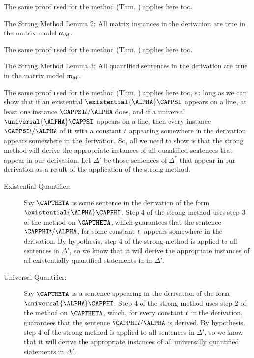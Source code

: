 \begin{PROOF}
The same proof used for the method (Thm. ) applies here too.
\end{PROOF}
\begin{THEOREM}{ The Strong Method Lemma 2:}
All matrix instances in the derivation are true in the matrix model $\mathfrak{m}_M$.
\end{THEOREM}
\begin{PROOF}
The same proof used for the method (Thm. ) applies here too.
\end{PROOF}
\begin{THEOREM}{ The Strong Method Lemma 3:}
All quantified sentences in the derivation are true in the matrix model $\mathfrak{m}_M$.
\end{THEOREM}
\begin{PROOF}
The same proof used for the method (Thm. ) applies here too, so long as we can show that if an existential $\existential{\ALPHA}\CAPPSI$ appears on a line, at least one instance $\CAPPSI\variable{t}/\ALPHA$ does, and if a universal $\universal{\ALPHA}\CAPPSI$ appears on a line, then every instance $\CAPPSI\variable{t}/\ALPHA$ of it with a constant $t$ appearing somewhere in the derivation appears somewhere in the derivation. So, all we need to show is that the strong method will derive the appropriate instances of all quantified sentences that appear in our derivation. Let $\Delta'$ be those sentences of $\Delta^*$ that appear in our derivation as a result of the application of the strong method.

\begin{description}
\item[Existential Quantifier:] 
Say $\CAPTHETA$ is some sentence in the derivation of the form $\existential{\ALPHA}\CAPPHI$. 
Step 4 of the strong method uses step 3 of the method on $\CAPTHETA$, which guarantees that the sentence $\CAPPHI\variable{t}/\ALPHA$, for some constant $t$, appears somewhere in the derivation.
By hypothesis, step 4 of the strong method is applied to all sentences in $\Delta'$, so we know that it will derive the appropriate instances of all existentially quantified statements in in $\Delta'$.

\item[Universal Quantifier:]
Say $\CAPTHETA$ is a sentence appearing in the derivation of the form $\universal{\ALPHA}\CAPPHI$. 
Step 4 of the strong method uses step 2 of the method on $\CAPTHETA$, which, for every constant $t$ in the derivation, guarantees that the sentence $\CAPPHI\variable{t}/\ALPHA$ is derived.
By hypothesis, step 4 of the strong method is applied to all sentences in $\Delta'$, so we know that it will derive the appropriate instances of all universally quantified statements in $\Delta'$.
\end{description}


\end{PROOF}

